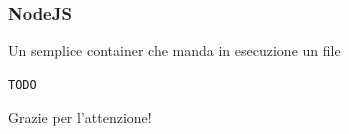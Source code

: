 \documentclass{beamer}
\begin{document}

\begin{frame}[fragile]
\frametitle{NodeJS}
\begin{block}{Un semplice container che manda in esecuzione un file}
\begin{verbatim}
TODO
\end{verbatim}
\end{block}
\end{frame}







\begin{frame}
\Huge{\centerline{Grazie per l'attenzione!}}
\end{frame}

\end{document}
